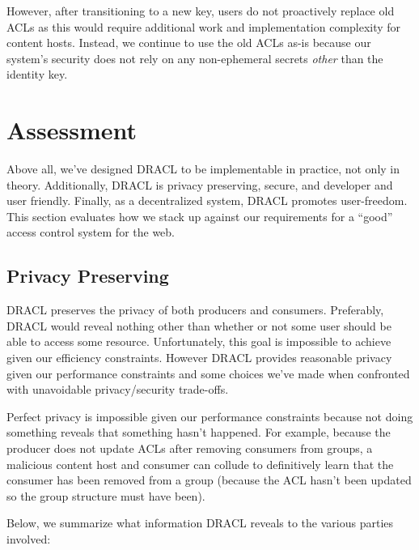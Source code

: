 \documentclass[pdftex,12pt,a4papaer,twoside,notitlepage]{report}
\begin{document}
However, after transitioning to a new key, users do not proactively replace old
ACLs as this would require additional work and implementation complexity for
content hosts. Instead, we continue to use the old ACLs as-is because our
system's security does not rely on any non-ephemeral secrets \emph{other} than
the identity key.

\chapter{Assessment}

Above all, we've designed DRACL to be implementable in practice, not only in
theory. Additionally, DRACL is privacy preserving, secure, and developer and
user friendly. Finally, as a decentralized system, DRACL promotes user-freedom.
This section evaluates how we stack up against our requirements for a ``good''
access control system for the web.

\section{Privacy Preserving}
\label{sec:privacy}

DRACL preserves the privacy of both producers and consumers. Preferably, DRACL
would reveal nothing other than whether or not some user should be able to
access some resource. Unfortunately, this goal is impossible to achieve given
our efficiency constraints. However DRACL provides reasonable privacy given our
performance constraints and some choices we've made when confronted with
unavoidable privacy/security trade-offs.

Perfect privacy is impossible given our performance constraints because not
doing something reveals that something hasn't happened. For example, because the
producer does not update ACLs after removing consumers from groups, a malicious
content host and consumer can collude to definitively learn that the consumer
has been removed from a group (because the ACL hasn't been updated so the group
structure must have been).

Below, we summarize what information DRACL reveals to the various parties involved:
\end{document}
